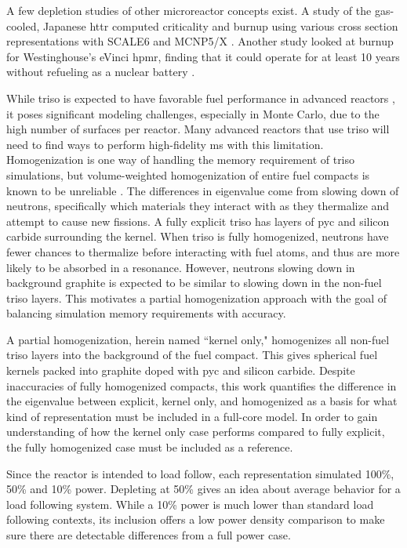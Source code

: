 \documentclass[letterpaper]{physor2024}
\begin{document}
A few depletion studies of other microreactor concepts exist. A study of the gas-cooled, Japanese \gls{httr} computed criticality and burnup using various cross section representations with SCALE6 and MCNP5/X \cite{chiang-gcmr}. Another study looked at burnup for Westinghouse's eVinci \gls{hpmr}, finding that it could operate for at least 10 years without refueling as a nuclear battery \cite{Hernandez-hpmr}.

While \gls{triso} is expected to have favorable fuel performance in advanced reactors \cite{triso-overview}, it poses significant modeling challenges, especially in Monte Carlo, due to the high number of surfaces per reactor. Many advanced reactors that use \gls{triso} will need to find ways to perform high-fidelity \gls{ms} with this limitation. Homogenization is one way of handling the memory requirement of \gls{triso} simulations, but volume-weighted homogenization of entire fuel compacts is known to be unreliable \cite{kim_reactivity_equivalent_2005}. The differences in eigenvalue come from slowing down of neutrons, specifically which materials they interact with as they thermalize and attempt to cause new fissions. A fully explicit \gls{triso} has layers of \gls{pyc} and silicon carbide surrounding the kernel. When \gls{triso} is fully homogenized, neutrons have fewer chances to thermalize before interacting with fuel atoms, and thus are more likely to be absorbed in a resonance. However, neutrons slowing down in background graphite is expected to be similar to slowing down in the non-fuel \gls{triso} layers. This motivates a partial homogenization approach with the goal of balancing simulation memory requirements with accuracy.

A partial homogenization, herein named ``kernel only," homogenizes all non-fuel \gls{triso} layers into the background of the fuel compact. This gives spherical fuel kernels packed into graphite doped with \gls{pyc} and silicon carbide. Despite inaccuracies of fully homogenized compacts, this work quantifies the difference in the eigenvalue between explicit, kernel only, and homogenized as a basis for what kind of representation must be included in a full-core model. In order to gain understanding of how the kernel only case performs compared to fully explicit, the fully homogenized case must be included as a reference.

Since the reactor is intended to load follow, each representation simulated 100\%, 50\% and 10\% power. Depleting at 50\% gives an idea about average behavior for a load following system. While a 10\% power is much lower than standard load following contexts, its inclusion offers a low power density comparison to make sure there are detectable differences from a full power case.
\end{document}
